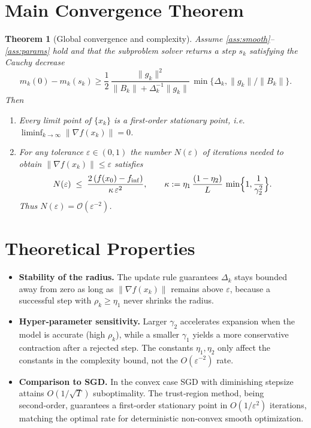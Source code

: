 \documentclass[11pt]{article}
\newtheorem{theorem}{Theorem}
\begin{document}
\section*{Main Convergence Theorem}
\begin{theorem}[Global convergence and complexity]\label{thm:main}
Assume \ref{ass:smooth}--\ref{ass:params} hold and that the subproblem solver returns a step $s_{k}$ satisfying the \emph{Cauchy decrease}
\[
m_{k}(0)-m_{k}(s_{k})\ge \frac{1}{2}\,\frac{\|g_{k}\|^{2}}{\|B_{k}\|+ \Delta_{k}^{-1}\|g_{k}\|}\,\min\{\Delta_{k},\|g_{k}\|/\|B_{k}\|\}.
\tag{C}
\]
Then
\begin{enumerate}[label=(\roman*)]
\item\label{itm:limit} Every limit point of $\{x_{k}\}$ is a first‑order stationary point, i.e. $\liminf_{k\to\infty}\|\nabla f(x_{k})\|=0$.
\item\label{itm:rate} For any tolerance $\varepsilon\in(0,1)$ the number $N(\varepsilon)$ of iterations needed to obtain $\|\nabla f(x_{k})\|\le\varepsilon$ satisfies
\[
N(\varepsilon)\;\le\; \frac{2\,(f(x_{0})-f_{\inf})}{\kappa\,\varepsilon^{2}} ,
\qquad
\kappa:=\eta_{1}\,\frac{(1-\eta_{2})}{L}\,\min\Bigl\{1,\frac{1}{\gamma_{2}^{2}}\Bigr\}.
\]
Thus $N(\varepsilon)=\mathcal O(\varepsilon^{-2})$.
\end{enumerate}
\end{theorem}

\section*{Theoretical Properties}
\begin{itemize}
\item \textbf{Stability of the radius.}  The update rule guarantees $\Delta_{k}$ stays bounded away from zero as long as $\|\nabla f(x_{k})\|$ remains above $\varepsilon$, because a successful step with $\rho_{k}\ge\eta_{1}$ never shrinks the radius.
\item \textbf{Hyper‑parameter sensitivity.}  Larger $\gamma_{2}$ accelerates expansion when the model is accurate (high $\rho_{k}$), while a smaller $\gamma_{1}$ yields a more conservative contraction after a rejected step.  The constants $\eta_{1},\eta_{2}$ only affect the constants in the complexity bound, not the $O(\varepsilon^{-2})$ rate.
\item \textbf{Comparison to SGD.}  In the convex case SGD with diminishing stepsize attains $O(1/\sqrt{T})$ suboptimality.  The trust‑region method, being second‑order, guarantees a first‑order stationary point in $O(1/\varepsilon^{2})$ iterations, matching the optimal rate for deterministic non‑convex smooth optimization.
\end{itemize}
\end{document}
